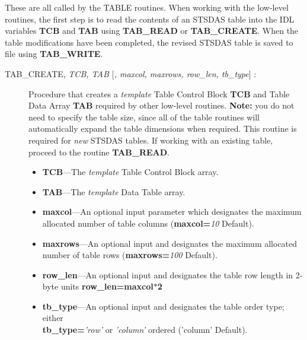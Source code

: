 These are all called by the TABLE routines.  When working with the low-level
routines, the first step is to read the contents of an STSDAS table into the
IDL variables {\bf TCB} and {\bf TAB} using {\bf TAB\_READ} or {\bf
TAB\_CREATE}.  When the table  modifications have been completed,
the revised STSDAS table is saved to file using {\bf TAB\_WRITE}.\\ 

\begin{description}

\item [TAB\_CREATE, {\it TCB, TAB $[$, maxcol, maxrows, row\_len,
tb\_type$]$} :] 

Procedure that creates a {\it template} Table Control Block {\bf TCB} and Table Data Array
{\bf TAB} required by other low-level routines.  {\bf Note:} you do not need to
specify the table size, since all of the table routines will automatically 
expand the table dimensions when required.  This routine is required for 
{\it new} STSDAS tables.  If working with an existing table, proceed to the 
routine {\bf TAB\_READ}.

\begin{itemize}

\item {\bf TCB}---The {\it template} Table Control Block array.

\item {\bf TAB}---The {\it template} Data Table array.

\item {\bf maxcol}---An optional input parameter which designates the maximum 
allocated number of table columns ({\bf maxcol=}{\it 10} Default).

\item {\bf maxrows}---An optional input and designates the maximum allocated 
number of table rows ({\bf maxrows=}{\it 100} Default).

\item {\bf row\_len}---An optional input and designates the table row length 
in 2-byte units {\bf row\_len=maxcol$*$2}

\item {\bf tb\_type}---An optional input and designates the table order 
type; either\\
{\bf tb\_type=}{\it 'row'} or {\it 'column'} ordered ('column' Default).

\end{itemize}


\end{description}
